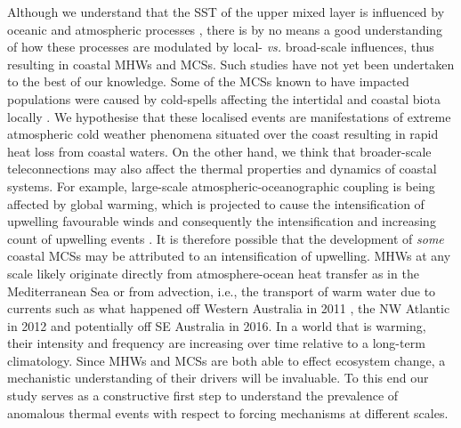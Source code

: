 \documentclass[a4paper,10pt,review]{elsarticle}
\begin{document}
Although we understand that the SST of the upper mixed layer is influenced by oceanic and atmospheric processes \citep[see Equation 1 of][]{Deser2010}, there is by no means a good understanding of how these processes are modulated by local- \emph{vs.} broad-scale influences, thus resulting in coastal MHWs and MCSs. Such studies have not yet been undertaken to the best of our knowledge. Some of the MCSs known to have impacted populations were caused by cold-spells affecting the intertidal and coastal biota locally \citep{Gunter1941, Firth2011}. We hypothesise that these localised events are manifestations of extreme atmospheric cold weather phenomena situated over the coast resulting in rapid heat loss from coastal waters. On the other hand, we think that broader-scale teleconnections may also affect the thermal properties and dynamics of coastal systems. For example, large-scale atmospheric-oceanographic coupling is being affected by global warming, which is projected to cause the intensification of upwelling favourable winds and consequently the intensification and increasing count of upwelling events \citep[see][for a review of this and alternative hypotheses]{Garcia-Reyes2015}. It is therefore possible that the development of \emph{some} coastal MCSs may be attributed to an intensification of upwelling. MHWs at any scale likely originate directly from atmosphere-ocean heat transfer as in the Mediterranean Sea \citep[e.g.][]{Garrabou2009} or from advection, i.e., the transport of warm water due to currents such as what happened off Western Australia in 2011 \citep{Feng2013, Benthuysen2014}, the NW Atlantic in 2012 \citep{Mills2012, Chen2014, Chen2015} and potentially off SE Australia in 2016. In a world that is warming, their intensity and frequency are increasing over time relative to a long-term climatology. Since MHWs and MCSs are both able to effect ecosystem change, a mechanistic understanding of their drivers will be invaluable. To this end our study serves as a constructive first step to understand the prevalence of anomalous thermal events with respect to forcing mechanisms at different scales.
\end{document}
